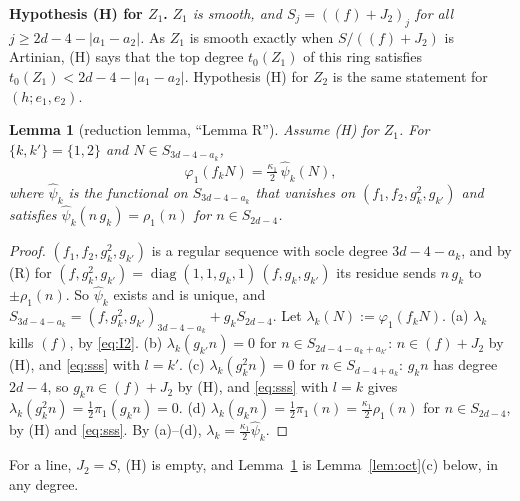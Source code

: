 \documentclass[11pt]{article}
\numberwithin{equation}{section}
\newtheorem{lemma}[theorem]{Lemma}
\theoremstyle{remark}
\newcommand{\run}[1]{\medskip\noindent\textbf{#1}}
\begin{document}
\run{Hypothesis (H) for $Z_1$.} \emph{$Z_1$ is smooth, and $S_j=((f)+J_2)_j$ for all $j\ge2d-4-|a_1-a_2|$.}
As $Z_1$ is smooth exactly when $S/((f)+J_2)$ is Artinian, (H) says that the top degree $t_0(Z_1)$ of this ring
satisfies $t_0(Z_1)<2d-4-|a_1-a_2|$. Hypothesis (H) for $Z_2$ is the same statement for $(h;e_1,e_2)$.

\begin{lemma}[reduction lemma, ``Lemma R'']\label{lem:R}
Assume \textup{(H)} for $Z_1$. For $\{k,k'\}=\{1,2\}$ and $N\in S_{3d-4-a_k}$,
\[
\varphi_1(f_kN)=\tfrac{\kappa_1}2\,\hat\psi_k(N),
\]
where $\hat\psi_k$ is the functional on $S_{3d-4-a_k}$ that vanishes on $(f_1,f_2,g_k^2,g_{k'})$ and satisfies
$\hat\psi_k(n\,g_k)=\rho_1(n)$ for $n\in S_{2d-4}$.
\end{lemma}
\begin{proof}
$(f_1,f_2,g_k^2,g_{k'})$ is a regular sequence with socle degree $3d-4-a_k$, and by (R) for
$(f,g_k^2,g_{k'})=\operatorname{diag}(1,1,g_k,1)\,(f,g_k,g_{k'})$ its residue sends $n\,g_k$ to $\pm\rho_1(n)$. So
$\hat\psi_k$ exists and is unique, and $S_{3d-4-a_k}=(f,g_k^2,g_{k'})_{3d-4-a_k}+g_kS_{2d-4}$. Let
$\lambda_k(N):=\varphi_1(f_kN)$. (a) $\lambda_k$ kills $(f)$, by \eqref{eq:I2}. (b) $\lambda_k(g_{k'}n)=0$ for
$n\in S_{2d-4-a_k+a_{k'}}$: $n\in(f)+J_2$ by (H), and \eqref{eq:sss} with $l=k'$. (c) $\lambda_k(g_k^2n)=0$ for
$n\in S_{d-4+a_k}$: $g_kn$ has degree $2d-4$, so $g_kn\in(f)+J_2$ by (H), and \eqref{eq:sss} with $l=k$ gives
$\lambda_k(g_k^2n)=\frac12\pi_1(g_kn)=0$. (d) $\lambda_k(g_kn)=\frac12\pi_1(n)=\frac{\kappa_1}2\rho_1(n)$ for
$n\in S_{2d-4}$, by (H) and \eqref{eq:sss}. By (a)--(d), $\lambda_k=\frac{\kappa_1}2\hat\psi_k$.
\end{proof}
For a line, $J_2=S$, (H) is empty, and Lemma~\ref{lem:R} is Lemma~\ref{lem:oct}(c) below, in any degree.
\end{document}
